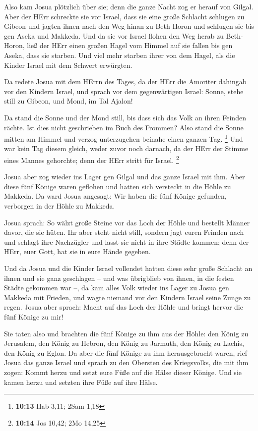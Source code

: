  Also kam Josua plötzlich über sie; denn die ganze Nacht zog
er herauf von Gilgal.  Aber der HErr schreckte sie vor
Israel, dass sie eine große Schlacht schlugen zu Gibeon und jagten ihnen
nach den Weg hinan zu Beth-Horon und schlugen sie bis gen Aseka und
Makkeda.  Und da sie vor Israel flohen den Weg herab zu
Beth-Horon, ließ der HErr einen großen Hagel vom Himmel auf sie fallen
bis gen Aseka, dass sie starben. Und viel mehr starben ihrer von dem
Hagel, als die Kinder Israel mit dem Schwert erwürgten.

 Da redete Josua mit dem HErrn des Tages, da der HErr die
Amoriter dahingab vor den Kindern Israel, und sprach vor dem
gegenwärtigen Israel: Sonne, stehe still zu Gibeon, und Mond, im Tal
Ajalon!

 Da stand die Sonne und der Mond still, bis dass sich das
Volk an ihren Feinden rächte. Ist dies nicht geschrieben im Buch des
Frommen? Also stand die Sonne mitten am Himmel und verzog unterzugehen
beinahe einen ganzen Tag. \footnote{\textbf{10:13} Hab 3,11; 2Sam 1,18}
 Und war kein Tag diesem gleich, weder zuvor noch darnach,
da der HErr der Stimme eines Mannes gehorchte; denn der HErr stritt für
Israel. \footnote{\textbf{10:14} Jos 10,42; 2Mo 14,25}

 Josua aber zog wieder ins Lager gen Gilgal und das ganze
Israel mit ihm.  Aber diese fünf Könige waren geflohen und
hatten sich versteckt in die Höhle zu Makkeda.  Da ward
Josua angesagt: Wir haben die fünf Könige gefunden, verborgen in der
Höhle zu Makkeda.

 Josua sprach: So wälzt große Steine vor das Loch der Höhle
und bestellt Männer davor, die sie hüten.  Ihr aber steht
nicht still, sondern jagt euren Feinden nach und schlagt ihre Nachzügler
und lasst sie nicht in ihre Städte kommen; denn der HErr, euer Gott, hat
sie in eure Hände gegeben.

 Und da Josua und die Kinder Israel vollendet hatten diese
sehr große Schlacht an ihnen und sie ganz geschlagen -- und was
übrigblieb von ihnen, in die festen Städte gekommen war --,
 da kam alles Volk wieder ins Lager zu Josua gen Makkeda
mit Frieden, und wagte niemand vor den Kindern Israel seine Zunge zu
regen.  Josua aber sprach: Macht auf das Loch der Höhle und
bringt hervor die fünf Könige zu mir!

 Sie taten also und brachten die fünf Könige zu ihm aus der
Höhle: den König zu Jerusalem, den König zu Hebron, den König zu
Jarmuth, den König zu Lachis, den König zu Eglon.  Da aber
die fünf Könige zu ihm herausgebracht waren, rief Josua das ganze Israel
und sprach zu den Obersten des Kriegsvolks, die mit ihm zogen: Kommt
herzu und setzt eure Füße auf die Hälse dieser Könige. Und sie kamen
herzu und setzten ihre Füße auf ihre Hälse.

